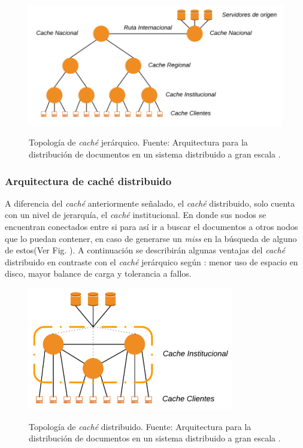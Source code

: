 \documentclass[12pt]{ociamthesis}  %
\begin{document}
\begin{figure}[!htb]
	\centering
	\includegraphics[width=12cm]{Imagenes/Topologia_cache_jerarquico}\\
	\caption{Topología de \textit{caché} jerárquico. Fuente: Arquitectura para la distribución de documentos en un sistema distribuido a gran escala \cite{sosa2002arquitectura}.}
	\label{topologia_cache_jerarq}
\end{figure}
 
\subsubsection{Arquitectura de caché distribuido}
A diferencia del \textit{caché} anteriormente señalado, el \textit{caché} distribuido, solo cuenta con un nivel de jerarquía, el \textit{caché} institucional. En donde sus nodos se encuentran conectados entre si para así ir a buscar el documentos a otros nodos que lo puedan contener, en caso de generarse un \textit{miss} en la búsqueda de alguno de estos(Ver Fig. ). A continuación se describirán algunas ventajas del \textit{caché} distribuido en contraste con el \textit{caché} jerárquico según \cite{nagaraj2004web}: menor uso de espacio en disco, mayor balance de carga y tolerancia a fallos.

\begin{figure}[!htb]
	\centering
	\includegraphics[width=9cm]{Imagenes/Topologia_cache_distribuido}\\
	\caption{Topología de \textit{caché} distribuido. Fuente: Arquitectura para la distribución de documentos en un sistema distribuido a gran escala \cite{sosa2002arquitectura}.}
	\label{topologia_cache_distribuido}
\end{figure}
\end{document}

